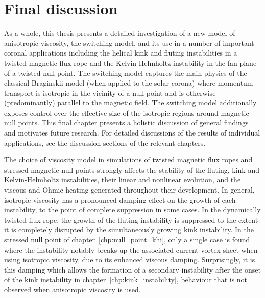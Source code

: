 \chapter{Final discussion}

\label{chp:summary}

As a whole, this thesis presents a detailed investigation of a new model of anisotropic viscosity, the switching model, and its use in a number of important coronal applications including the helical kink and fluting instabilities in a twisted magnetic flux rope and the Kelvin-Helmholtz instability in the fan plane of a twisted null point. The switching model captures the main physics of the classical Braginskii model (when applied to the solar corona) where momentum transport is isotropic in the vicinity of a null point and is otherwise (predominantly) parallel to the magnetic field. The switching model additionally exposes control over the effective size of the isotropic regions around magnetic null points. This final chapter presents a holistic discussion of general findings and motivates future research. For detailed discussions of the results of individual applications, see the discussion sections of the relevant chapters.

The choice of viscosity model in simulations of twisted magnetic flux ropes and stressed magnetic null points strongly affects the stability of the fluting, kink and Kelvin-Helmholtz instabilities, their linear and nonlinear evolution, and the viscous and Ohmic heating generated throughout their development. In general, isotropic viscosity has a pronounced damping effect on the growth of each instability, to the point of complete suppression in some cases. In the dynamically twisted flux rope, the growth of the fluting instability is suppressed to the extent it is completely disrupted by the simultaneously growing kink instability. In the stressed null point of chapter~\ref{chp:null_point_khi}, only a single case is found where the instability notably breaks up the associated current-vortex sheet when using isotropic viscosity, due to its enhanced viscous damping. Surprisingly, it is this damping which allows the formation of a secondary instability after the onset of the kink instability in chapter~\ref{chp:kink_instability}, behaviour that is not observed when anisotropic viscosity is used.


